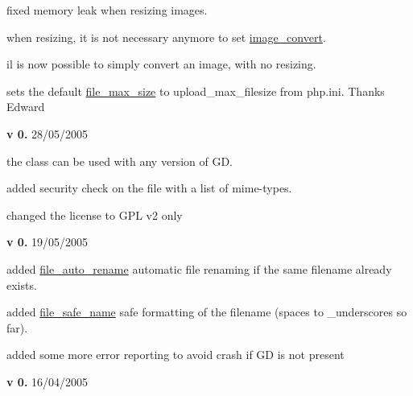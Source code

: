 \begin{DoxyItemize}
\begin{DoxyItemize}
\item fixed memory leak when resizing images.~\newline

\item when resizing, it is not necessary anymore to set \hyperlink{}{image\+\_\+convert}.~\newline

\item il is now possible to simply convert an image, with no resizing.~\newline

\item sets the default \hyperlink{}{file\+\_\+max\+\_\+size} to upload\+\_\+max\+\_\+filesize from php.\+ini. Thanks Edward 
\end{DoxyItemize}
\item {\bfseries v 0.} 28/05/2005~\newline

\begin{DoxyItemize}
\item the class can be used with any version of G\+D.~\newline

\item added security check on the file with a list of mime-\/types.~\newline

\item changed the license to G\+P\+L v2 only 
\end{DoxyItemize}
\item {\bfseries v 0.} 19/05/2005~\newline

\begin{DoxyItemize}
\item added \hyperlink{}{file\+\_\+auto\+\_\+rename} automatic file renaming if the same filename already exists.~\newline

\item added \hyperlink{}{file\+\_\+safe\+\_\+name} safe formatting of the filename (spaces to \+\_\+underscores so far).~\newline

\item added some more error reporting to avoid crash if G\+D is not present 
\end{DoxyItemize}
\item {\bfseries v 0.} 16/04/2005~\newline


\end{DoxyItemize}

